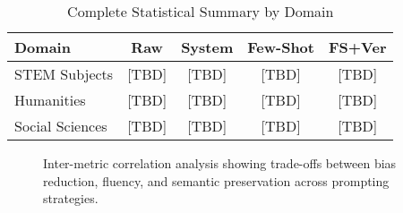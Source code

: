 \documentclass[conference]{IEEEtran}
\begin{document}
\begin{table}[h]
\centering
\caption{Complete Statistical Summary by Domain}
\label{tab:domain_stats}
\begin{tabular}{|l|c|c|c|c|}
\hline
\textbf{Domain} & \textbf{Raw} & \textbf{System} & \textbf{Few-Shot} & \textbf{FS+Ver} \\
\hline
STEM Subjects & [TBD] & [TBD] & [TBD] & [TBD] \\
Humanities & [TBD] & [TBD] & [TBD] & [TBD] \\
Social Sciences & [TBD] & [TBD] & [TBD] & [TBD] \\
\hline
\end{tabular}
\end{table}

\begin{figure}[h]
\centering
\caption{Inter-metric correlation analysis showing trade-offs between bias reduction, fluency, and semantic preservation across prompting strategies.}
\label{fig:correlation_matrix}
\end{figure}



\end{document}
